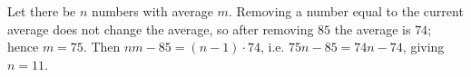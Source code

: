 Let there be $n$ numbers with average $m$. Removing a number equal to the current average does not change the average, so after removing $85$ the average is $74$; hence $m=75$. Then $nm-85=(n-1)\cdot74$, i.e. $75n-85=74n-74$, giving $n=\boxed{11}$.
